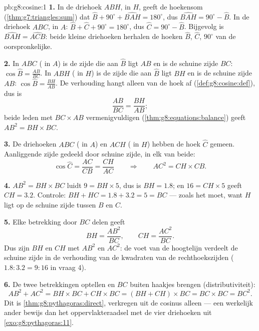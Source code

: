 \begin{solution}{pb:g8:cosine:1}
\textbf{1.} In de driehoek $ABH$,  in $H$, geeft de hoekensom
(\cref{thm:g7:triangles:sum}) dat
$\widehat B + 90^\circ + \widehat{BAH} = 180^\circ$, dus
$\widehat{BAH} = 90^\circ - \widehat B$. In de driehoek $ABC$,  in
$A$: $\widehat B + \widehat C + 90^\circ = 180^\circ$, dus
$\widehat C = 90^\circ - \widehat B$. Bijgevolg is
$\widehat{BAH} = \widehat{ACB}$: beide kleine driehoeken herhalen de hoeken
$\widehat B$, $\widehat C$, $90^\circ$ van de oorspronkelijke.

\textbf{2.} In $ABC$ ( in $A$) is de zijde die aan $\widehat B$ ligt
$AB$ en is de schuine zijde $BC$: $\cos\widehat B = \frac{AB}{BC}$. In $ABH$
( in $H$) is de zijde die aan $\widehat B$ ligt $BH$ en is de schuine
zijde $AB$: $\cos\widehat B = \frac{BH}{AB}$. De verhouding hangt alleen van de
hoek af (\cref{def:g8:cosine:def}), dus is
\[
\frac{AB}{BC} = \frac{BH}{AB} ;
\]
beide leden met $BC \times AB$ vermenigvuldigen
(\cref{thm:g8:equations:balance}) geeft $AB^2 = BH \times BC$.

\textbf{3.} De driehoeken $ABC$ ( in $A$) en $ACH$ ( in
$H$) hebben de hoek $\widehat C$ gemeen. Aanliggende zijde gedeeld door schuine
zijde, in elk van beide:
\[
\cos\widehat C = \frac{AC}{CB} = \frac{CH}{AC}
\qquad\Longrightarrow\qquad
AC^2 = CH \times CB .
\]

\textbf{4.} $AB^2 = BH \times BC$ luidt $9 = BH \times 5$, dus is $BH = 1.8$; en
$16 = CH \times 5$ geeft $CH = 3.2$. Controle:
$BH + HC = 1.8 + 3.2 = 5 = BC$ --- zoals het moet, want $H$ ligt op de schuine
zijde tussen $B$ en $C$.

\textbf{5.} Elke betrekking door $BC$ delen geeft
\[
BH = \frac{AB^2}{BC},
\qquad
CH = \frac{AC^2}{BC} .
\]
Dus zijn $BH$ en $CH$  met $AB^2$ en $AC^2$: de voet van de hoogtelijn
verdeelt de schuine zijde in de verhouding van de kwadraten van de
rechthoekszijden ($1.8 : 3.2 = 9 : 16$ in vraag 4).

\textbf{6.} De twee betrekkingen optellen en $BC$ buiten haakjes brengen
(distributiviteit):
\[
AB^2 + AC^2 = BH \times BC + CH \times BC
= (BH + CH) \times BC = BC \times BC = BC^2 .
\]
Dit is \cref{thm:g8:pythagoras:direct}, verkregen uit de cosinus alleen --- een
werkelijk ander bewijs dan het oppervlakteraadsel met de vier driehoeken uit
\cref{exo:g8:pythagoras:11}.


\end{solution}
